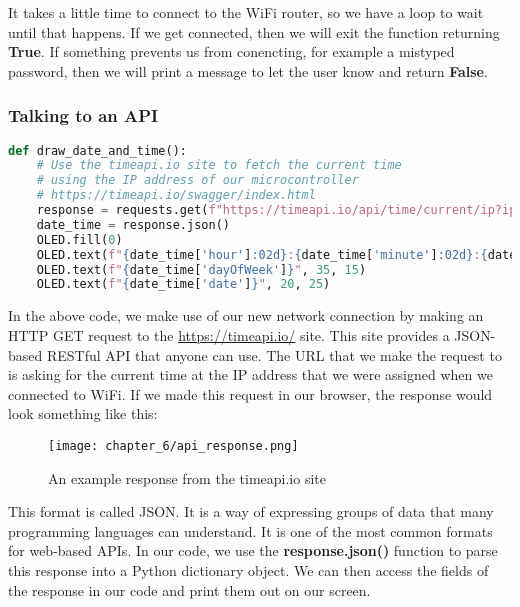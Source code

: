 It takes a little time to connect to the WiFi router, so we have a loop to wait until that happens. If we
get connected, then we will exit the function returning \textbf{True}. If something prevents us from conencting,
for example a mistyped password, then we will print a message to let the user know and return \textbf{False}.

\subsubsection{Talking to an API}
\begin{lstlisting}[language=Python,caption=Making Web Requests]
def draw_date_and_time():
    # Use the timeapi.io site to fetch the current time
    # using the IP address of our microcontroller
    # https://timeapi.io/swagger/index.html
    response = requests.get(f"https://timeapi.io/api/time/current/ip?ipAddress={IP_ADDRESS}")
    date_time = response.json()
    OLED.fill(0)
    OLED.text(f"{date_time['hour']:02d}:{date_time['minute']:02d}:{date_time['seconds']:02d}", 30, 5)
    OLED.text(f"{date_time['dayOfWeek']}", 35, 15)
    OLED.text(f"{date_time['date']}", 20, 25)
\end{lstlisting}

In the above code, we make use of our new network connection by making an HTTP GET request to the \url{https://timeapi.io/}
site. This site provides a JSON-based RESTful API that anyone can use. The URL that we make the request to is
asking for the current time at the IP address that we were assigned when we connected to WiFi. If we made this request
in our browser, the response would look something like this:

\begin{figure}[H]
    \centering
    \texttt{[image: chapter\_6/api\_response.png]}
    \caption{An example response from the timeapi.io site}
\end{figure}

This format is called JSON. It is a way of expressing groups of data that many programming languages can
understand. It is one of the most common formats for web-based APIs. In our code, we use the \textbf{response.json()}
function to parse this response into a Python dictionary object. We can then access the fields of the response in
our code and print them out on our screen.

